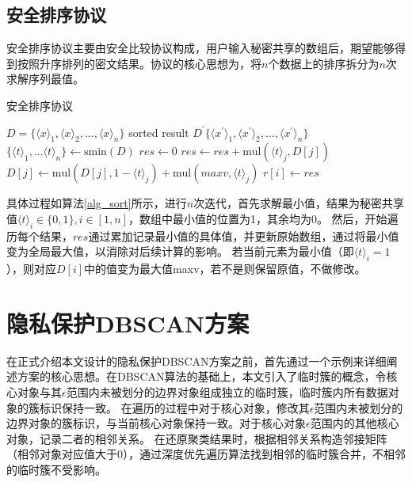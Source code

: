 \subsection{安全排序协议}
安全排序协议主要由安全比较协议构成，用户输入秘密共享的数组后，期望能够得到按照升序排列的密文结果。协议的核心思想为，将$ n $个数据上的排序拆分为$ n $次求解序列最值。
\begin{algorithm}[htbp]
	\renewcommand{\algorithmicrequire}{\textbf{输入:}}
	\renewcommand{\algorithmicensure}{\textbf{输出:}}
	\caption{安全排序协议}
	\label{alg_sort}
	\begin{algorithmic}[1]
		\REQUIRE $ D = \{\langle x\rangle_1, \langle x\rangle_2,...,\langle x\rangle_n\} $
		\ENSURE sorted result $ D^{\prime}\{\langle x^{\prime}\rangle_1, \langle x^{\prime}\rangle_2,...,\langle x^{\prime}\rangle_n\} $
		\STATE $ \{\langle t\rangle_1,...\langle t \rangle_n\} \leftarrow \text{smin}(D)$
		\STATE $ res \leftarrow 0 $
		\STATE $ res \leftarrow res + \text{mul}(\langle t \rangle_j, D[j]) $
		\STATE $ D[j] \leftarrow \text{mul}(D[j],1-\langle t \rangle_j) + \text{mul}(maxv, \langle t \rangle_j)$
		\ENDFOR
		\STATE $ r[i] \leftarrow res $
		\ENDFOR
	\end{algorithmic}
\end{algorithm}

具体过程如算法\ref{alg_sort}所示，进行$ n $次迭代，首先求解最小值，结果为秘密共享值$ \langle t \rangle_i \in \{0,1\}, i\in[1,n] $，数组中最小值的位置为1，其余均为0。
然后，开始遍历每个结果，$ res $通过累加记录最小值的具体值，并更新原始数组，通过将最小值变为全局最大值，以消除对后续计算的影响。
若当前元素为最小值（即$\langle t \rangle_i=1  $ ），则对应$ D[i] $中的值变为最大值maxv，若不是则保留原值，不做修改。


\section{隐私保护DBSCAN方案}
\label{s4-t1}
在正式介绍本文设计的隐私保护DBSCAN方案之前，首先通过一个示例来详细阐述方案的核心思想。在DBSCAN算法的基础上，本文引入了临时簇的概念，令核心对象与其$ \epsilon $范围内未被划分的边界对象组成独立的临时簇，临时簇内所有数据对象的簇标识保持一致。
在遍历的过程中对于核心对象，修改其$ \epsilon $范围内未被划分的边界对象的簇标识，与当前核心对象保持一致。对于核心对象$ \epsilon $范围内的其他核心对象，记录二者的相邻关系。
在还原聚类结果时，根据相邻关系构造邻接矩阵（相邻对象对应值大于0），通过深度优先遍历算法找到相邻的临时簇合并，不相邻的临时簇不受影响。

